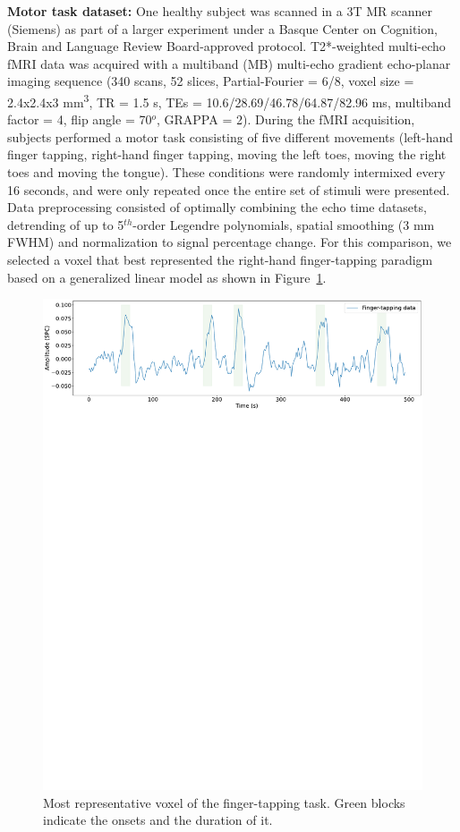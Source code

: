 \textbf{Motor task dataset:} One healthy subject was scanned in a 3T MR scanner (Siemens) as part of a larger experiment under a Basque Center on Cognition, Brain and Language Review Board-approved protocol. T2*-weighted multi-echo fMRI data was acquired with a multiband (MB) multi-echo gradient echo-planar imaging sequence (340 scans, 52 slices, Partial-Fourier = 6/8, voxel size = 2.4x2.4x3 mm\textsuperscript{3}, TR = 1.5 s, TEs = 10.6/28.69/46.78/64.87/82.96 ms, multiband factor = 4, flip angle = 70\(^o\), GRAPPA = 2). During the fMRI acquisition, subjects performed a motor task consisting of five different movements (left-hand finger tapping, right-hand finger tapping, moving the left toes, moving the right toes and moving the tongue). These conditions were randomly intermixed every 16 seconds, and were only repeated once the entire set of stimuli were presented. Data preprocessing consisted of optimally combining the echo time datasets, detrending of up to 5\(^{th}\)-order Legendre polynomials, spatial smoothing (3 mm FWHM) and normalization to signal percentage change. For this comparison, we selected a voxel that best represented the right-hand finger-tapping paradigm based on a generalized linear model as shown in Figure~\ref{fig:finger_tapping}.

\begin{figure}[h]
    \begin{center}
        \includegraphics[width=\columnwidth]{figures/finger_tapping.pdf}
    \end{center}
    \caption{Most representative voxel of the finger-tapping task. Green blocks indicate the onsets and the duration of it.}
\label{fig:finger_tapping}
\end{figure}

